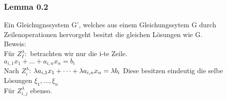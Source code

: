 \documentclass{article}
\newcommand{\lb}{\lambda}
\begin{document}
\subsubsection{Lemma 0.2}
Ein Gleichugnssystem G', welches aus einem Gleichungssytem G durch Zeilenoperationen hervorgeht besitzt die gleichen Lösungen wie G.\\
Beweis:\\
Für $Z_I^\lb: $ betrachten wir nur die i-te Zeile.\\
$a_{i,1}x_1 + \dots + a_{i,n}x_n = b_i$\\
Nach $Z_i^\lb$:
$\lb a_{i,1}x_1 + \dots + \lb a_{i,n}x_n = \lb b_i\\$
Diese besitzen eindeutig die selbe Lösungen $\xi_1, \dots, \xi_n$\\
Für $Z_{i,j}^\lb$ ebenso.
\end{document}
